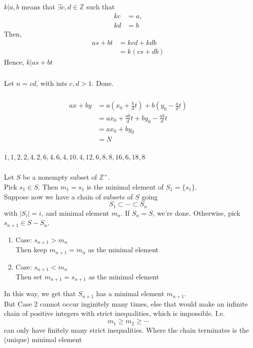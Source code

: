 \documentclass{article}
\begin{document}
\subsubsection{}
\newcommand{\ints}{\mathbb{Z}}
$k | a,b$ means that $\exists c,d \in \ints$ such that 
\begin{align*}
kc &= a,\\
kd &= b
\end{align*}
Then,
\begin{align*}
as + bt &= kcd + kdb\\
&= k(cs + db)
\end{align*}
Hence, $k | as + bt$
\subsubsection{}
Let $n = cd$, with ints $c,d > 1$. Done.
\subsubsection{}
\begin{align*}
ax + by 
&= 
a(x_0 + \frac{b}{d}t)
+ b(y_0 - \frac{a}{d}t)\\
&= ax_0 + \frac{ab}{d}t + by_0 -\frac{ab}{d}t\\
&= ax_0 + by_0\\
&= N
\end{align*}
\subsubsection{}
$1,1,2,2,4,2,6,4,6,4,10,4,12,6,8,8,16,6,18,8$
\subsubsection{}
Let $S$ be a nonempty subset of $\ints^+$.\\
\newcommand{\set}[1]{ \{ #1 \} }
Pick $s_1 \in S$. Then $m_1 = s_1$ is the minimal element of $S_1 = \set{s_1}$.\\
Suppose now we have a chain of subsets of $S$ going
\begin{equation*}
S_1 \subset \cdots \subset S_n
\end{equation*}
with $|S_i| = i$, and minimal element $m_n$. If $S_n = S$, we're done. Otherwise, pick $s_{n+1} \in S - S_n$.
\begin{enumerate}
\item Case: $s_{n+1} > m_n$\\
Then keep $m_{n+1} = m_n$ as the minimal element
\item Case: $s_{n+1} < m_n$\\
Then set $m_{n+1} = s_{n+1}$ as the minimal element
\end{enumerate}
In this way, we get that $S_{n+1}$ has a minimal element $m_{n+1}$.\\
But Case 2 cannot occur inginitely many times, else that would make an infinite chain of positive integers with strict inequalities, which is impossible. I.e.
\begin{equation*}
m_1 \geq m_2 \geq \cdots
\end{equation*}
can only have finitely many strict inequalities. Where the chain terminates is the (unique) minimal element
\end{document}
